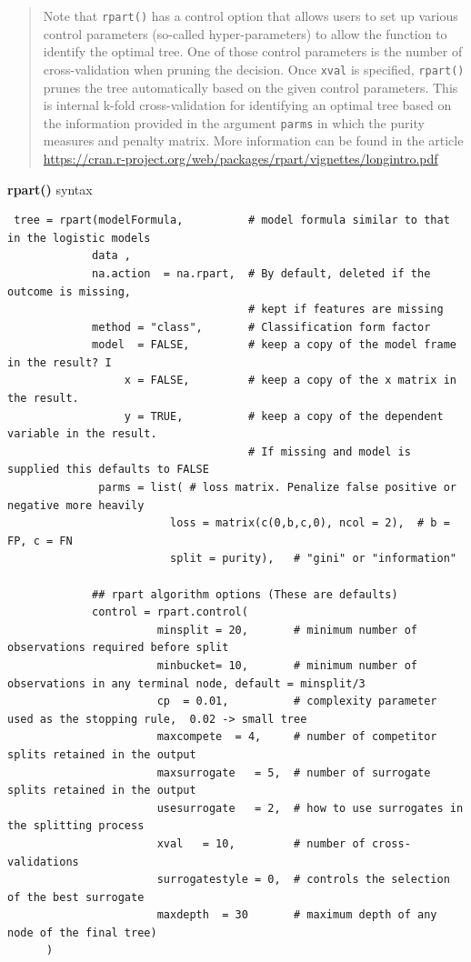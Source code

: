 \documentclass[
]{book}
\begin{document}
\begin{quote}
Note that \texttt{rpart()} has a control option that allows users to set up various control parameters (so-called hyper-parameters) to allow the function to identify the optimal tree. One of those control parameters is the number of cross-validation when pruning the decision. Once \texttt{xval} is specified, \texttt{rpart()} prunes the tree automatically based on the given control parameters. This is internal k-fold cross-validation for identifying an optimal tree based on the information provided in the argument \texttt{parms} in which the purity measures and penalty matrix. More information can be found in the article \url{https://cran.r-project.org/web/packages/rpart/vignettes/longintro.pdf}
\end{quote}

\hfill\break

\textbf{rpart()} syntax

\begin{verbatim}
 tree = rpart(modelFormula,          # model formula similar to that in the logistic models
             data , 
             na.action  = na.rpart,  # By default, deleted if the outcome is missing, 
                                     # kept if features are missing
             method = "class",       # Classification form factor
             model  = FALSE,         # keep a copy of the model frame in the result? I
                  x = FALSE,         # keep a copy of the x matrix in the result.
                  y = TRUE,          # keep a copy of the dependent variable in the result. 
                                     # If missing and model is supplied this defaults to FALSE
              parms = list( # loss matrix. Penalize false positive or negative more heavily
                         loss = matrix(c(0,b,c,0), ncol = 2),  # b = FP, c = FN
                         split = purity),   # "gini" or "information"
             
             ## rpart algorithm options (These are defaults)
             control = rpart.control(
                       minsplit = 20,       # minimum number of observations required before split
                       minbucket= 10,       # minimum number of observations in any terminal node, default = minsplit/3
                       cp  = 0.01,          # complexity parameter used as the stopping rule,  0.02 -> small tree
                       maxcompete  = 4,     # number of competitor splits retained in the output
                       maxsurrogate   = 5,  # number of surrogate splits retained in the output
                       usesurrogate   = 2,  # how to use surrogates in the splitting process
                       xval   = 10,         # number of cross-validations
                       surrogatestyle = 0,  # controls the selection of the best surrogate
                       maxdepth  = 30       # maximum depth of any node of the final tree)
      )
\end{verbatim}
\end{document}
